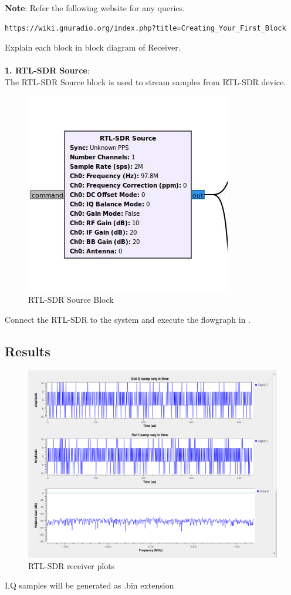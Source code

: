 \textbf{Note}:
Refer the following website for any queries.
\begin{lstlisting}
https://wiki.gnuradio.org/index.php?title=Creating_Your_First_Block
\end{lstlisting}
 Explain each block in block diagram of Receiver.\\
	\solution \\
\textbf{1. RTL-SDR Source}:\\
The RTL-SDR Source block is used to stream samples from RTL-SDR device.
\begin{figure}[H]
\centering
\includegraphics[width=0.4\columnwidth]{figs/source_block.png}
\caption{RTL-SDR Source Block}
\label{fig:source block}
\end{figure}
Connect the RTL-SDR to the system and execute the flowgraph in .\\



\subsection{Results} 
\begin{figure}
\includegraphics[width=0.8\columnwidth]{figs/RTL_sdr_res.png}
\caption{RTL-SDR receiver plots}
\end{figure}
I,Q samples will be generated as .bin extension

